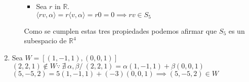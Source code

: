 \documentclass[11pt]{article}
\begin{document}
\begin{enumerate}
\begin{enumerate}
\begin{itemize}
          \item Sea $r$ in $\mathbb{R}$.\\
           $ \langle rv , \alpha \rangle = r \langle v, \alpha \rangle = r 0 = 0 
           \implies rv \in S_5$  
        \end{itemize}
        Como se cumplen estas tres propiedades podemos afirmar que $S_5$ es un 
        subespacio de $\mathbb{R}^4$
    \end{enumerate}
  \item Sea $W=\left[ (1,-1, 1), (0,0,1) \right]$\\
    $(2,2,1) \notin W \because \ \nexists \ \alpha, \beta / 
    \ (2,2,1) = \alpha (1, -1, 1) + \beta (0, 0, 1)$ \\
    $(5,-5,2) = 5 (1, -1, 1) + (-3) (0, 0, 1) \implies (5, -5, 2) \in W$\\


\end{enumerate}
\end{document}
